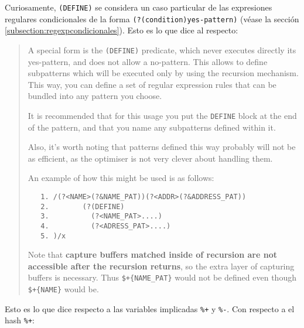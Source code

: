 Curiosamente, \verb|(DEFINE)| se considera un caso particular de 
las expresiones regulares condicionales de la forma \verb|(?(condition)yes-pattern)|
(véase la sección \ref{subsection:regexpcondicionales}).
Esto es lo que dice  al respecto:
\begin{it}
\begin{quotation}
A special form is the \verb|(DEFINE)|  predicate, which never executes
directly its yes-pattern, and does not allow a no-pattern. This allows
to define subpatterns which will be executed only by using the recursion
mechanism. This way, you can define a set of regular expression rules
that can be bundled into any pattern you choose.

It is recommended that for this usage you put the \verb|DEFINE| block at the
end of the pattern, and that you name any subpatterns defined within it.

Also, it's worth noting that patterns defined this way probably will not
be as efficient, as the optimiser is not very clever about handling them.

An example of how this might be used is as follows:

\begin{verbatim}
   1. /(?<NAME>(?&NAME_PAT))(?<ADDR>(?&ADDRESS_PAT))
   2.        (?(DEFINE)
   3.          (?<NAME_PAT>....)
   4.          (?<ADRESS_PAT>....)
   5. )/x
\end{verbatim}

Note that {\bf capture buffers matched inside of recursion are not accessible
after the recursion returns}, so the extra layer of capturing buffers is
necessary. Thus \verb|$+{NAME_PAT}| would not be defined even though 
\verb|$+{NAME}|
would be.
\end{quotation}
\end{it}

Esto es lo que dice  respecto a las variables implicadas \verb|%+|
y \verb|%-|. Con respecto a el hash \verb|%+|:

